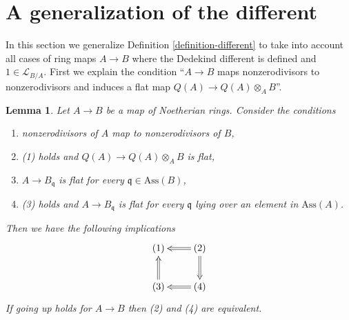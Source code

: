 \documentclass{stacks-project}
\theoremstyle{plain}
\newtheorem{lemma}[subsection]{Lemma}
\theoremstyle{definition}
\theoremstyle{remark}
\numberwithin{equation}{subsection}
\begin{document}
\section{A generalization of the different}
\label{section-different-generalization}

\noindent
In this section we generalize Definition \ref{definition-different}
to take into account all cases of ring maps $A \to B$
where the Dedekind different is defined and $1 \in \mathcal{L}_{B/A}$.
First we explain the condition ``$A \to B$ maps nonzerodivisors to
nonzerodivisors and induces a flat map $Q(A) \to Q(A) \otimes_A B$''.

\begin{lemma}
\label{lemma-explain-condition}
Let $A \to B$ be a map of Noetherian rings. Consider the conditions
\begin{enumerate}
\item nonzerodivisors of $A$ map to nonzerodivisors of $B$,
\item (1) holds and $Q(A) \to Q(A) \otimes_A B$ is flat,
\item $A \to B_\mathfrak q$ is flat for every
$\mathfrak q \in \text{Ass}(B)$,
\item (3) holds and $A \to B_\mathfrak q$ is flat for every $\mathfrak q$
lying over an element in $\text{Ass}(A)$.
\end{enumerate}
Then we have the following implications
$$
\xymatrix{
(1) & (2) \ar@{=>}[l] \ar@{=>}[d] \\
(3) \ar@{=>}[u] & (4) \ar@{=>}[l]
}
$$
If going up holds for $A \to B$ then (2) and (4) are equivalent.
\end{lemma}
\end{document}
